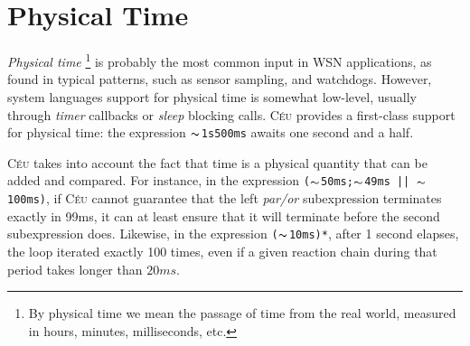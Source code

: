 \documentclass[10pt]{sigplan-proc-varsize-sensys11}
\newcommand{\2}{\;\;}
\newcommand{\5}{\;\;\;\;\;}
\newcommand{\til}{$\thicksim$}
\newcommand{\CEU}{\textsc{C\'{e}u}}
\newcommand{\code}[1] {{\small{\texttt{#1}}}}
\begin{document}

\section{Physical Time}
\label{sec.time}

\emph{Physical time}%
\footnote{
By physical time we mean the passage of time from the real world, measured in 
hours, minutes, milliseconds, etc.
}
is probably the most common input in WSN applications, as found in typical 
patterns, such as sensor sampling, and watchdogs.
However, system languages support for physical time is somewhat low-level, 
usually through \emph{timer} callbacks or \emph{sleep} blocking calls.
\CEU{} provides a first-class support for physical time: the expression 
\code{\til{}1s500ms} awaits one second and a half.

\CEU{} takes into account the fact that time is a physical quantity that can be 
added and compared.
For instance, in the expression \code{(\til{}50ms;\til{}49ms~||~\til{}100ms)}, 
if \CEU{} cannot guarantee that the left \emph{par/or} subexpression terminates 
exactly in 99ms, it can at least ensure that it will terminate before the 
second subexpression does.
Likewise, in the expression \code{(\til{}10ms)*}, after 1 second elapses, the 
loop iterated exactly 100 times, even if a given reaction chain during that 
period takes longer than $20ms$.
\end{document}
